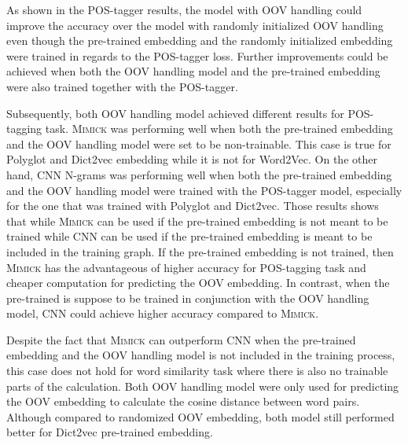     As shown in the POS-tagger results, the model with OOV handling
    could improve the accuracy over the model with randomly
    initialized OOV handling even though the pre-trained embedding and
    the randomly initialized embedding were trained in regards to the
    POS-tagger loss. Further improvements could be achieved when both
    the OOV handling model and the pre-trained embedding were also
    trained together with the POS-tagger. 

    Subsequently, both OOV handling model achieved different results
    for POS-tagging task. \textsc{Mimick} was performing well when
    both the pre-trained embedding and the OOV handling model were set
    to be non-trainable. This case is true for Polyglot and Dict2vec
    embedding while it is not for Word2Vec. On the other hand, CNN
    N-grams was performing well when both the pre-trained embedding
    and the OOV handling model were trained with the POS-tagger model,
    especially for the one that was trained with Polyglot and
    Dict2vec. Those results shows that while \textsc{Mimick} can be
    used if the pre-trained embedding is not meant to be trained
    while CNN can be used if the pre-trained embedding is meant to be
    included in the training graph. If the pre-trained embedding is
    not trained, then \textsc{Mimick} has the advantageous of higher
    accuracy for POS-tagging task and cheaper computation for
    predicting the OOV embedding. In contrast, when the pre-trained is
    suppose to be trained in conjunction with the OOV handling model,
    CNN could achieve higher accuracy compared to \textsc{Mimick}.

    Despite the fact that \textsc{Mimick} can outperform CNN when the
    pre-trained embedding and the OOV handling model is not included
    in the training process, this case does not hold for word
    similarity task where there is also no trainable parts of the
    calculation. Both OOV handling model were only used for predicting
    the OOV embedding to calculate the cosine distance between word
    pairs. Although compared to randomized OOV embedding, both model
    still performed better for Dict2vec pre-trained embedding.